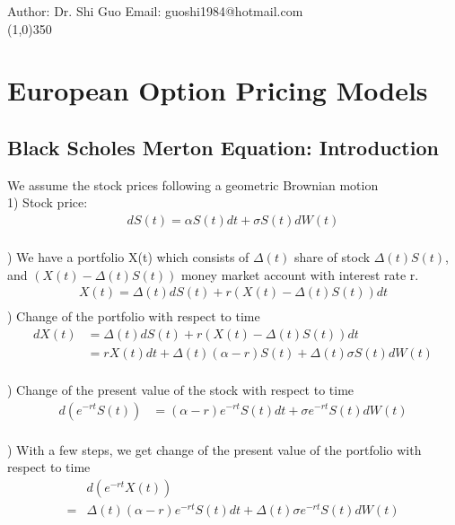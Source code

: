 \documentclass[a4paper]{article}
\begin{document}
Author: Dr. Shi Guo  \hspace{30mm} Email: guoshi1984@hotmail.com\\
\line(1,0){350}
\section{European Option Pricing Models}
\subsection{Black Scholes Merton Equation: Introduction}
We assume the stock prices following a geometric Brownian motion\\
1) Stock price:\\
\begin{align*}
	 dS(t) = \alpha S(t) dt + \sigma S(t) dW(t)\\
\end{align*}
 
) We have a portfolio X(t) which consists of $\Delta(t)$ share of stock  $\Delta(t) S(t)$, and $(X(t) - \Delta (t) S(t))$ money market account with interest rate r. \\  
\begin{align*}
	X(t) = \Delta(t) dS(t) + r(X(t) -\Delta(t) S(t)) dt\\
\end{align*}
) Change of the portfolio with respect to time
\begin{align*}
	  d X(t) & = \Delta(t) d S(t) + r(X(t) - \Delta(t) S(t)) dt \\
             & = r X(t) dt + \Delta(t) (\alpha - r )S(t) + \Delta (t) \sigma S(t) d W(t) \\
\end{align*}
                      
) Change of the present value of the stock with respect to time\\
\begin{align*}
	d(e^{-r t} S(t)) & = (\alpha - r) e^{- r t}S(t) dt + \sigma e^{- r t} S(t) dW(t) \\
\end{align*}

) With a few steps, we get change of the present value of the portfolio with respect to time\\
\begin{align*}
 & d(e^{- r t} X(t)) \\
 = & \Delta(t) (\alpha - r) e^{-rt} S(t) dt + \Delta(t) \sigma e^{-rt} S(t) dW(t)\\
\end{align*}
\end{document}
